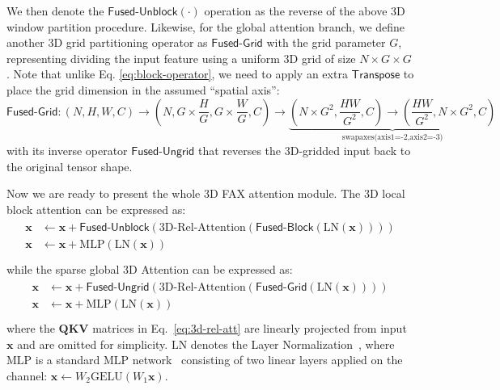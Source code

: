 \documentclass{article}
\begin{document}
{We then denote the $\mathsf{Fused\text{-}Unblock}(\cdot)$ operation as the reverse of the above 3D window partition procedure.
Likewise, for the global attention branch, we define another 3D grid partitioning operator as $\mathsf{Fused\text{-}Grid}$ with the grid parameter $G$, representing dividing the input feature using a uniform 3D grid of size $N\times G\times G$. Note that unlike Eq. \eqref{eq:block-operator}, we need to apply an extra $\mathsf{Transpose}$ to place the grid dimension in the assumed ``spatial axis'':
\begin{equation}
\label{eq:grid-operator}
\mathsf{Fused\text{-}Grid}:(N,H,W,C)\!\rightarrow\!(N,G\times \frac{H}{G},G\times\frac{W}{G},C)\!\rightarrow\! \underbrace{(N\!\times\! G^2,\frac{HW}{G^2},C)\rightarrow
(\frac{HW}{G^2},N\!\times\! G^2,\!C)}_{\text{swapaxes(axis1=-2,axis2=-3)}}
\end{equation}
with its inverse operator $\mathsf{Fused\text{-}Ungrid}$ that reverses the 3D-gridded input back to the original tensor shape.



Now we are ready to present the whole 3D FAX attention module.
The 3D local block attention can be expressed as:
\begin{align}
\begin{split}
\label{eq:multi-axis-attention}
\mathbf{x}&\leftarrow \mathbf{x} + \mathsf{Fused\text{-}Unblock}(\text{3D-Rel-Attention}(\mathsf{Fused\text{-}Block}(\text{LN}(\mathbf{x})))) \\ 
\mathbf{x}&\leftarrow\mathbf{x}+\text{MLP}(\text{LN}(\mathbf{x})) \\
\end{split}
\end{align}
while the sparse global 3D Attention can be expressed as:
\begin{align}
\begin{split}
\mathbf{x}&\leftarrow \mathbf{x} + \mathsf{Fused\text{-}Ungrid}(\text{3D-Rel-Attention}(\mathsf{Fused\text{-}Grid}(\text{LN}(\mathbf{x})))) \\ 
\mathbf{x}&\leftarrow\mathbf{x}+\text{MLP}(\text{LN}(\mathbf{x})) \\
\end{split}
\end{align}
where the $\mathbf{QKV}$ matrices in Eq.~\eqref{eq:3d-rel-att} are linearly projected from input $\mathbf{x}$ and are omitted for simplicity. $\text{LN}$ denotes the Layer Normalization~\cite{ba2016layer}, where $\text{MLP}$ is a standard MLP network~\cite{dosovitskiy2020image,liu2021swin} consisting of two linear layers applied on the channel: $\mathbf{x}\leftarrow W_2\text{GELU}(W_1\mathbf{x})$.

}
\end{document}
